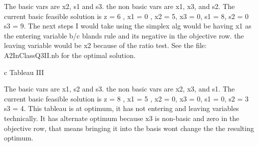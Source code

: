 \begin{enumerate}
The basic vars are x2, s1 and s3. the non basic vars are x1, x3, and s2. The current basic feasible solution is z = 6 , x1 = 0 , x2 = 5, x3 = 0, s1 = 8, s2 = 0 s3 = 9. The next steps I would take using the simplex alg would be having x1 as the entering variable b/c blands rule and its negative in the objective row. the leaving variable would be x2 because of the ratio test. See the file: A2InClassQ3II.nb for the optimal solution.



\begin{center}
  \begin{tabular}{c}
    Tableau III\\
\end{tabular}
\end{center}
The basic vars are x1, s2 and s3. the non basic vars are x2, x3, and s1. The current basic feasible solution is z = 8 , x1 = 5 , x2 = 0, x3 = 0, s1 = 0, s2 = 3 s3 = 4. This tableau is at optimum, it has not entering and leaving variables technically. It has alternate optimum because x3 is non-basic and zero in the objective row, that means bringing it into the basis wont change the the resulting optimum.

 \end{enumerate}
